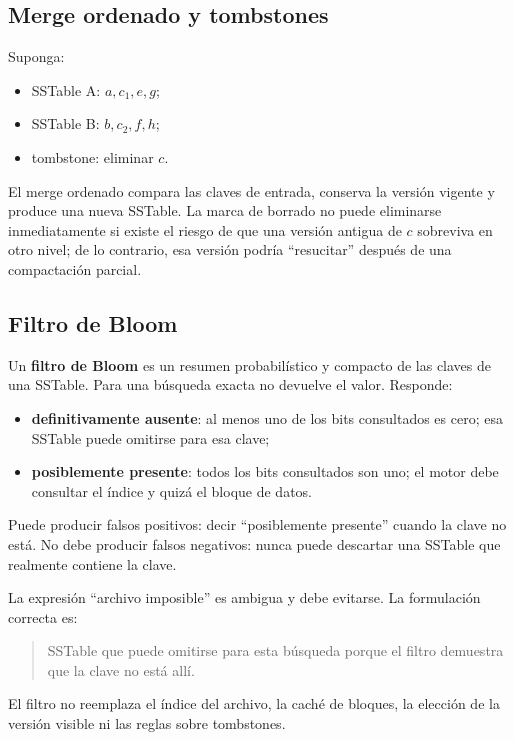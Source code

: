 \documentclass[variant=apuntes,cover=institutional,mode=screen]{ua-engineering-v6-article}
\begin{document}
\subsection{Merge ordenado y tombstones}

Suponga:

\begin{itemize}
\item SSTable A: $a,c_1,e,g$;
\item SSTable B: $b,c_2,f,h$;
\item tombstone: eliminar $c$.
\end{itemize}

El merge ordenado compara las claves de entrada, conserva la versión vigente y produce una nueva SSTable. La marca de borrado no puede eliminarse inmediatamente si existe el riesgo de que una versión antigua de $c$ sobreviva en otro nivel; de lo contrario, esa versión podría ``resucitar'' después de una compactación parcial.

\subsection{Filtro de Bloom}

Un \textbf{filtro de Bloom} es un resumen probabilístico y compacto de las claves de una SSTable. Para una búsqueda exacta no devuelve el valor. Responde:

\begin{itemize}
\item \textbf{definitivamente ausente}: al menos uno de los bits consultados es cero; esa SSTable puede omitirse para esa clave;
\item \textbf{posiblemente presente}: todos los bits consultados son uno; el motor debe consultar el índice y quizá el bloque de datos.
\end{itemize}

Puede producir falsos positivos: decir ``posiblemente presente'' cuando la clave no está. No debe producir falsos negativos: nunca puede descartar una SSTable que realmente contiene la clave.

La expresión ``archivo imposible'' es ambigua y debe evitarse. La formulación correcta es:

\begin{quote}
SSTable que puede omitirse para esta búsqueda porque el filtro demuestra que la clave no está allí.
\end{quote}

El filtro no reemplaza el índice del archivo, la caché de bloques, la elección de la versión visible ni las reglas sobre tombstones.
\end{document}
